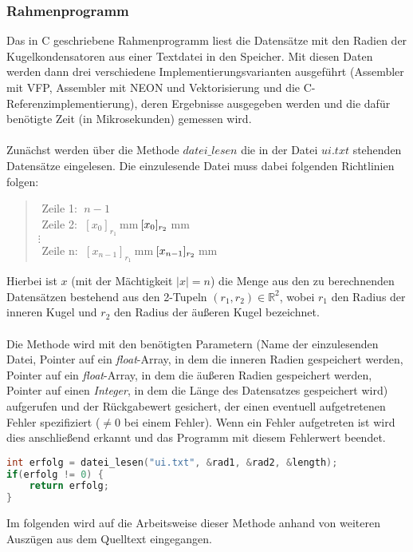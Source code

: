 \documentclass[11pt]{scrartcl}
\begin{document}
\subsubsection{Rahmenprogramm}
Das in C geschriebene Rahmenprogramm liest die Datensätze mit den Radien der Kugelkondensatoren aus einer Textdatei in den Speicher.
Mit diesen Daten werden dann drei verschiedene Implementierungsvarianten ausgeführt (Assembler mit VFP, Assembler mit NEON und Vektorisierung und die C-Referenzimplementierung), deren Ergebnisse ausgegeben werden und die dafür benötigte Zeit (in Mikrosekunden) gemessen wird.
\\\\
Zunächst werden über die Methode \emph{$datei\_lesen$} die in der Datei \emph{$ui.txt$} stehenden Datensätze eingelesen. Die einzulesende Datei muss dabei folgenden Richtlinien folgen:
\begin{verse}
$ $ Zeile 1: $\; \textbf{$n-1$} $ \\
$ $ Zeile 2: $\; \textbf{$[x_{0}]_{r_{1}}$} \: $mm$ \:\emph{$[x_{0}]_{r_{2}}$} \: $mm$ $ \\
$\vdots $\\
$ $ Zeile n: $\; \textbf{$[x_{n-1}]_{r_{1}}$} \: $mm$ \:\emph{$[x_{n-1}]_{r_{2}}$} \: $mm$ $
\end{verse}
Hierbei ist $x$ (mit der Mächtigkeit $\vert x \vert = n$) die Menge aus den zu berechnenden Datensätzen bestehend aus den 2-Tupeln $(r_{1},r_{2})\in \mathbb{R}^{2} $, wobei $r_{1}$ den Radius der inneren Kugel und $r_{2}$ den Radius der äußeren Kugel bezeichnet.\\\\
Die Methode wird mit den benötigten Parametern (Name der einzulesenden Datei,  Pointer auf ein \emph{float}-Array, in dem die inneren Radien gespeichert werden, Pointer auf ein \emph{float}-Array, in dem die äußeren Radien gespeichert werden, Pointer auf einen \emph{Integer}, in dem die Länge des Datensatzes gespeichert wird) aufgerufen und der Rückgabewert gesichert, der einen eventuell aufgetretenen Fehler spezifiziert ($\neq 0$ bei einem Fehler). Wenn ein Fehler aufgetreten ist wird dies anschließend erkannt und das Programm mit diesem Fehlerwert beendet.
\begin{lstlisting}[language=C]
int erfolg = datei_lesen("ui.txt", &rad1, &rad2, &length);
if(erfolg != 0) {
	return erfolg;
}
\end{lstlisting}
Im folgenden wird auf die Arbeitsweise dieser Methode anhand von weiteren Auszügen aus dem Quelltext eingegangen.\\\\
\end{document}
